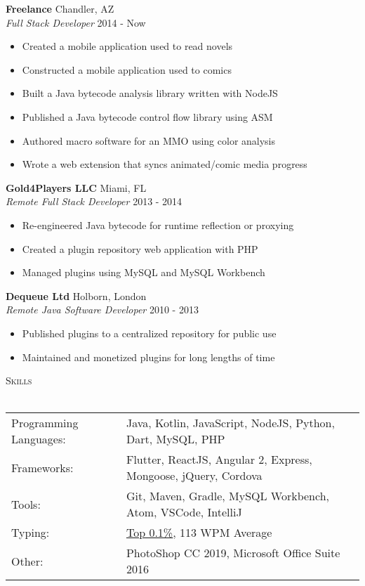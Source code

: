 \documentclass[a4paper]{article}
\newcommand{\lineunder} {
    \vspace*{-8pt} \\
    \hspace*{-18pt} \hrulefill \\
}
\newcommand{\header} [1] {
    {\hspace*{-18pt}\vspace*{6pt} \textsc{#1}}
    \vspace*{-6pt} \lineunder
}
\begin{document}
\textbf{Freelance} \hfill Chandler, AZ\\
\textit{Full Stack Developer} \hfill 2014 - Now\\
\vspace{-1mm}
\begin{itemize} \itemsep 1pt
	\item Created a mobile application used to read novels
	\item Constructed a mobile application used to comics
	\item Built a Java bytecode analysis library written with NodeJS
	\item Published a Java bytecode control flow library using ASM
	\item Authored macro software for an MMO using color analysis
	\item Wrote a web extension that syncs animated/comic media progress
\end{itemize}
\textbf{Gold4Players LLC} \hfill Miami, FL\\
\textit{Remote Full Stack Developer} \hfill 2013 - 2014\\
\vspace{-1mm}
\begin{itemize} \itemsep 1pt
	\item Re-engineered Java bytecode for runtime reflection or proxying
	\item Created a plugin repository web application with PHP
	\item Managed plugins using MySQL and MySQL Workbench
\end{itemize}
\textbf{Dequeue Ltd} \hfill Holborn, London\\
\textit{Remote Java Software Developer} \hfill 2010 - 2013\\
\vspace{-1mm}
\begin{itemize} \itemsep 1pt
	\item Published plugins to a centralized repository for public use
	\item Maintained and monetized plugins for long lengths of time
\end{itemize}

\header{Skills}
\vspace{2mm}
\begin{tabular}{ l l }
	Programming Languages: & Java, Kotlin, JavaScript, NodeJS, Python, Dart, MySQL, PHP    \\
	Frameworks:            & Flutter, ReactJS, Angular 2, Express, Mongoose, jQuery, Cordova
	\vspace{0.5mm}\\
	Tools:                 & Git, Maven, Gradle, MySQL Workbench, Atom, VSCode, IntelliJ
	\vspace{0.5mm}\\
	Typing:                & \href{https://data.typeracer.com/misc/badge?user=tsedlar}{\ul{Top 0.1\%}}, 113 WPM Average
	\vspace{0.5mm}\\
	Other:                 & PhotoShop CC 2019, Microsoft Office Suite 2016  \\
\end{tabular}
\vspace{2mm}
\end{document}
